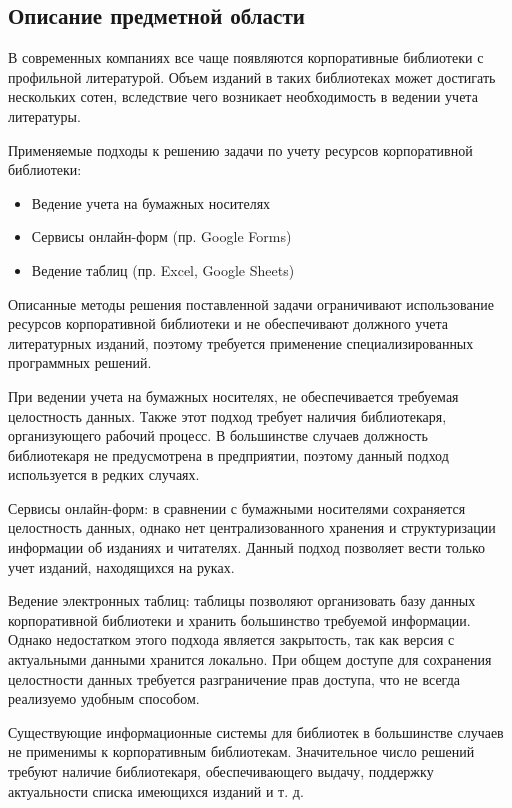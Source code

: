 \documentclass[./intro.tex]{subfiles}
\begin{document}
\subsection{Описание предметной области}
\par 
В современных компаниях все чаще появляются корпоративные библиотеки с профильной литературой.
Объем изданий в таких библиотеках может достигать нескольких сотен, вследствие чего возникает необходимость в ведении учета литературы.
\par
Применяемые подходы к решению задачи по учету ресурсов корпоративной библиотеки:
\begin{itemize}
    \item Ведение учета на бумажных носителях
    \item Сервисы онлайн-форм (пр. Google Forms)
    \item Ведение таблиц (пр. Excel, Google Sheets)
\end{itemize}
\par Описанные методы решения поставленной задачи ограничивают использование ресурсов корпоративной библиотеки и не обеспечивают должного учета литературных изданий, поэтому требуется применение специализированных программных решений.
\par При ведении учета на бумажных носителях, не обеспечивается требуемая целостность данных.
Также этот подход требует наличия библиотекаря, организующего рабочий процесс. 
В большинстве случаев должность библиотекаря не предусмотрена в предприятии, поэтому данный подход используется в редких случаях.
\par Сервисы онлайн-форм: в сравнении с бумажными носителями сохраняется целостность данных, однако нет централизованного хранения и структуризации информации об изданиях и читателях.
Данный подход позволяет вести только учет изданий, находящихся на руках.
\par Ведение электронных таблиц: таблицы позволяют организовать базу данных корпоративной библиотеки и хранить большинство требуемой информации. 
Однако недостатком этого подхода является закрытость, так как версия с актуальными данными хранится локально.
При общем доступе для сохранения целостности данных требуется разграничение прав доступа, что не всегда реализуемо удобным способом.
\par 
Существующие информационные системы для библиотек в большинстве случаев не применимы к корпоративным библиотекам.
Значительное число решений требуют наличие библиотекаря, обеспечивающего выдачу, поддержку актуальности списка имеющихся изданий и т. д.
\end{document}
